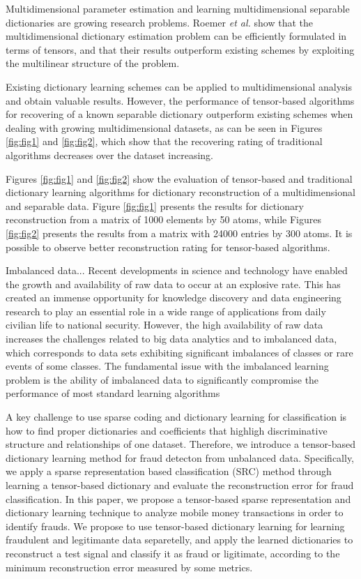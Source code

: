 Multidimensional parameter estimation and learning multidimensional separable dictionaries are growing research problems. Roemer \emph{et al.} \cite{roemer2014tensor} show that the multidimensional dictionary estimation problem can be efficiently formulated in terms of tensors, and that their results outperform existing schemes by exploiting the multilinear structure of the problem.

Existing dictionary learning schemes can be applied to multidimensional analysis and obtain valuable results. However, the performance of tensor-based algorithms for recovering of a known separable dictionary outperform existing schemes when dealing with growing multidimensional datasets, as can be seen in Figures \ref{fig:fig1} and \ref{fig:fig2}, which show that the recovering rating of traditional algorithms decreases over the dataset increasing.

Figures \ref{fig:fig1} and \ref{fig:fig2} show the evaluation of tensor-based and traditional dictionary learning algorithms for dictionary reconstruction of a multidimensional and separable data. Figure \ref{fig:fig1} presents the results for dictionary reconstruction from a matrix of 1000 elements by 50 atoms, while Figures \ref{fig:fig2} presents the results from a matrix with 24000 entries by 300 atoms. It is possible to observe better reconstruction rating for tensor-based algorithms. 

Imbalanced data...
Recent developments in science and technology have enabled the growth and availability of raw data to occur at an explosive rate. This has created an immense opportunity for knowledge discovery and data engineering research to play an essential role in a wide range of applications from daily civilian life to national security. However, the high availability of raw data increases the challenges related to big data analytics and to imbalanced data, which corresponds to data sets exhibiting significant imbalances of classes or rare events of some classes. The fundamental issue with the imbalanced learning problem is the ability of imbalanced data to significantly compromise the performance of most standard learning algorithms

A key challenge to use sparse coding and dictionary learning for classification is how to find proper dictionaries and coefficients that highligh discriminative structure and relationships of one dataset. Therefore, we introduce a tensor-based dictionary learning method for fraud detecton from unbalanced data. Specifically, we apply a sparse representation based classification (SRC) method through learning a tensor-based dictionary and evaluate the reconstruction error for fraud classification. In this paper, we propose a tensor-based sparse representation and dictionary learning technique to analyze mobile money transactions in order to identify frauds. We propose to use tensor-based dictionary learning for learning fraudulent and legitimante data separetelly, and apply the learned dictionaries to reconstruct a test signal and classify it as fraud or ligitimate, according to the minimum reconstruction error measured by some metrics.

